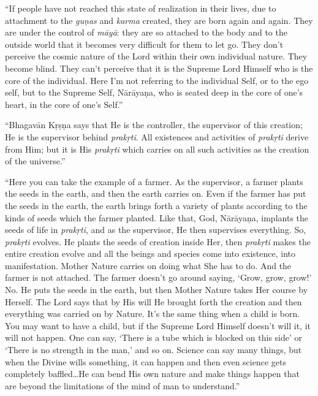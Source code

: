 \documentclass[12pt, twoside, openright]{memoir}
\begin{document}
\enquote{If people have not reached this state of realization in their lives, due to attachment to the \textit{guṇas} and \textit{karma} created, they are born again and again. They are under the control of \textit{māyā}: they are so attached to the body and to the outside world that it becomes very difficult for them to let go. They don’t perceive the cosmic nature of the Lord within their own individual nature. They become blind. They can’t perceive that it is the Supreme Lord Himself who is the core of the individual. Here I’m not referring to the individual Self, or to the ego self, but to the Supreme Self, Nārāyaṇa, who is seated deep in the core of one’s heart, in the core of one’s Self.}

\enquote{Bhagavān Kṛṣṇa says that He is the controller, the supervisor of this creation; He is the supervisor behind \textit{prakṛti}. All existences and activities of \textit{prakṛti} derive from Him; but it is His \textit{prakṛti} which carries on all such activities as the creation of the universe.}

\enquote{Here you can take the example of a farmer. As the supervisor, a farmer plants the seeds in the earth, and then the earth carries on. Even if the farmer has put the seeds in the earth, the earth brings forth a variety of plants according to the kinds of seeds which the farmer planted. Like that, God, Nārāyaṇa, implants the seeds of life in \textit{prakṛti}, and as the supervisor, He then supervises everything. So, \textit{prakṛti} evolves. He plants the seeds of creation inside Her, then \textit{prakṛti} makes the entire creation evolve and all the beings and species come into existence, into manifestation. Mother Nature carries on doing what She has to do. And the farmer is not attached. The farmer doesn’t go around saying, \enquote{Grow, grow, grow!} No. He puts the seeds in the earth, but then Mother Nature takes Her course by Herself. The Lord says that by His will He brought forth the creation and then everything was carried on by Nature. It’s the same thing when a child is born. You may want to have a child, but if the Supreme Lord Himself doesn’t will it, it will not happen. One can say, \enquote{There is a tube which is blocked on this side} or \enquote{There is no strength in the man,} and so on. Science can say many things, but when the Divine wills something, it can happen and then even science gets completely baffled\ldots He can bend His own nature and make things happen that are beyond the limitations of the mind of man to understand.}
\end{document}

